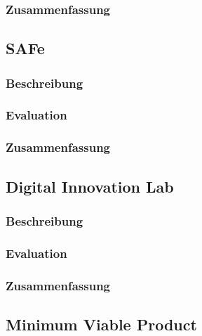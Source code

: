 \todots

\subsubsection{Zusammenfassung}

\todots

\subsection{SAFe}

\subsubsection{Beschreibung}

\todots

\subsubsection{Evaluation}

\todots

\subsubsection{Zusammenfassung}

\todots

\subsection{Digital Innovation Lab}

\subsubsection{Beschreibung}

\todots

\subsubsection{Evaluation}

\todots

\subsubsection{Zusammenfassung}

\todots

\subsection{Minimum Viable Product}

